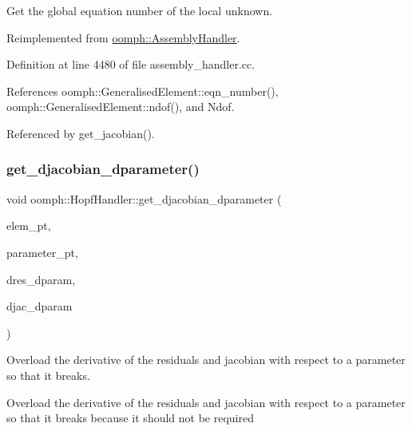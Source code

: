 Get the global equation number of the local unknown. 



Reimplemented from \hyperlink{classoomph_1_1AssemblyHandler_a94d28e2de2559cde803d1ba2195b5290}{oomph\+::\+Assembly\+Handler}.



Definition at line 4480 of file assembly\+\_\+handler.\+cc.



References oomph\+::\+Generalised\+Element\+::eqn\+\_\+number(), oomph\+::\+Generalised\+Element\+::ndof(), and Ndof.



Referenced by get\+\_\+jacobian().

\mbox{\label{classoomph_1_1HopfHandler_a59fb2c41d850cfe1fdccc3e97ca75135}} 
\subsubsection{\texorpdfstring{get\+\_\+djacobian\+\_\+dparameter()}{get\_djacobian\_dparameter()}}
{\footnotesize\ttfamily void oomph\+::\+Hopf\+Handler\+::get\+\_\+djacobian\+\_\+dparameter (\begin{DoxyParamCaption}\item[{\hyperlink{classoomph_1_1GeneralisedElement}{Generalised\+Element} $\ast$const \&}]{elem\+\_\+pt,  }\item[{double $\ast$const \&}]{parameter\+\_\+pt,  }\item[{\hyperlink{classoomph_1_1Vector}{Vector}$<$ double $>$ \&}]{dres\+\_\+dparam,  }\item[{\hyperlink{classoomph_1_1DenseMatrix}{Dense\+Matrix}$<$ double $>$ \&}]{djac\+\_\+dparam }\end{DoxyParamCaption})\hspace{0.3cm}{\ttfamily [virtual]}}



Overload the derivative of the residuals and jacobian with respect to a parameter so that it breaks. 

Overload the derivative of the residuals and jacobian with respect to a parameter so that it breaks because it should not be required 

